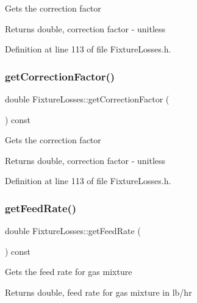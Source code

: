 Gets the correction factor \begin{DoxyReturn}{Returns}
double, correction factor -\/ unitless 
\end{DoxyReturn}


Definition at line 113 of file Fixture\+Losses.\+h.

\mbox{\label{class_fixture_losses_af643d715a8b1369efa586fa43e75c732}} 
\subsubsection{\texorpdfstring{get\+Correction\+Factor()}{getCorrectionFactor()}\hspace{0.1cm}{\footnotesize\ttfamily [3/3]}}
{\footnotesize\ttfamily double Fixture\+Losses\+::get\+Correction\+Factor (\begin{DoxyParamCaption}{ }\end{DoxyParamCaption}) const\hspace{0.3cm}{\ttfamily [inline]}}

Gets the correction factor \begin{DoxyReturn}{Returns}
double, correction factor -\/ unitless 
\end{DoxyReturn}


Definition at line 113 of file Fixture\+Losses.\+h.

\mbox{\label{class_fixture_losses_a09707af8de4b304c65f4aeb1130ea44e}} 
\subsubsection{\texorpdfstring{get\+Feed\+Rate()}{getFeedRate()}\hspace{0.1cm}{\footnotesize\ttfamily [1/3]}}
{\footnotesize\ttfamily double Fixture\+Losses\+::get\+Feed\+Rate (\begin{DoxyParamCaption}{ }\end{DoxyParamCaption}) const\hspace{0.3cm}{\ttfamily [inline]}}

Gets the feed rate for gas mixture \begin{DoxyReturn}{Returns}
double, feed rate for gas mixture in lb/hr 
\end{DoxyReturn}


